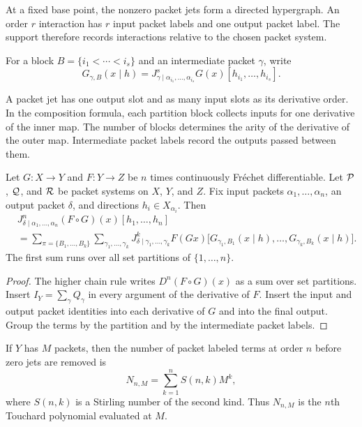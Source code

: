 At a fixed base point, the nonzero packet jets form a directed hypergraph.  An order $r$ interaction has $r$ input packet labels and one output packet label.  The support therefore records interactions relative to the chosen packet system.

For a block $B=\{i_1<\cdots<i_s\}$ and an intermediate packet $\gamma$, write
\[
G_{\gamma,B}(x\mid h)
=
J^s_{\gamma\mid\alpha_{i_1},\ldots,\alpha_{i_s}}G(x)
[h_{i_1},\ldots,h_{i_s}].
\]

\begin{interpretation}[title={Arity of packet jets}]
A packet jet has one output slot and as many input slots as its derivative order. In the composition formula, each partition block collects inputs for one derivative of the inner map. The number of blocks determines the arity of the derivative of the outer map. Intermediate packet labels record the outputs passed between them.
\end{interpretation}

\begin{theorem}\label{thm:packet_faa}
Let $G:X\to Y$ and $F:Y\to Z$ be $n$ times continuously Fr\'echet differentiable.  Let $\mathcal P$, $\mathcal Q$, and $\mathcal R$ be packet systems on $X$, $Y$, and $Z$.  Fix input packets $\alpha_1,\ldots,\alpha_n$, an output packet $\delta$, and directions $h_i\in X_{\alpha_i}$.  Then
\[
\begin{aligned}
&J^{n}_{\delta\mid\alpha_1,\ldots,\alpha_n}(F\circ G)(x)
[h_1,\ldots,h_n]\\
&=
\sum_{\pi=\{B_1,\ldots,B_k\}}
\sum_{\gamma_1,\ldots,\gamma_k}
J^{k}_{\delta\mid\gamma_1,\ldots,\gamma_k}F(Gx)
\big[
G_{\gamma_1,B_1}(x\mid h),\ldots,
G_{\gamma_k,B_k}(x\mid h)
\big].
\end{aligned}
\]
The first sum runs over all set partitions of $\{1,\ldots,n\}$.
\end{theorem}

\begin{proof}
The higher chain rule writes $D^n(F\circ G)(x)$ as a sum over set partitions.  Insert $I_Y=\sum_\gamma Q_\gamma$ in every argument of the derivative of $F$.  Insert the input and output packet identities into each derivative of $G$ and into the final output.  Group the terms by the partition and by the intermediate packet labels.
\end{proof}

\begin{proposition}\label{prop:faa_term_count}
If $Y$ has $M$ packets, then the number of packet labeled terms at order $n$ before zero jets are removed is
\[
N_{n,M}
=
\sum_{k=1}^{n}S(n,k)M^k,
\]
where $S(n,k)$ is a Stirling number of the second kind.  Thus $N_{n,M}$ is the $n$th Touchard polynomial evaluated at $M$.
\end{proposition}

